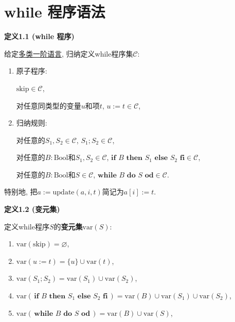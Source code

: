 \documentclass[UTF8]{ctexart}
\begin{document}
\setlength{\abovedisplayskip}{1pt}
\setlength{\belowdisplayskip}{1pt}

\section{while 程序语法}

\hypertarget{sec:定义1.1}{}
\noindent\textbf{定义1.1 (while 程序)}

给定\href{01 多类一阶语言#nameddest=sec:定义1.1}{多类一阶语言},
归纳定义while程序集$\mathcal{C}$:
\begin{enumerate}
    \item 原子程序:
    
    \hspace{3em}$\mathrm{skip}\in\mathcal{C}$,

    \hspace{3em}对任意同类型的变量$u$和项$t$, $u:=t\in\mathcal{C}$,

    \item 归纳规则:
    
    \hspace{3em}对任意的$S_1,S_2\in\mathcal{C}$, $S_1;S_2\in\mathcal{C}$,

    \hspace{3em}对任意的$B:\mathrm{Bool}$和$S_1,S_2\in\mathcal{C}$,
    $\mathbf{if}\,\,B\,\,\mathbf{then}\,\,S_1\,\,\mathbf{else}\,\,S_2
    \,\,\mathbf{fi}\in\mathcal{C}$,

    \hspace{3em}对任意的$B:\mathrm{Bool}$和$S\in\mathcal{C}$,
    $\mathbf{while}\,\,B\,\,\mathbf{do}\,\,S\,\,\mathbf{od}\in\mathcal{C}$.
\end{enumerate}

\vspace{10pt}

特别地, 把$a:=\mathrm{update}(a,i,t)$简记为$a[i]:=t$.

\vspace{30pt}

\hypertarget{sec:定义1.2}{}
\noindent\textbf{定义1.2 (变元集)}

定义while程序$S$的\textbf{变元集}$\mathrm{var}(S)$:
\begin{enumerate}
    \item $\mathrm{var}(\mathrm{skip})=\varnothing$,
    \item $\mathrm{var}(u:=t)=\{u\}\cup\mathrm{var}(t)$,
    \item $\mathrm{var}(S_1;S_2)=\mathrm{var}(S_1)\cup\mathrm{var}(S_2)$,
    \item $\mathrm{var}(\,\mathbf{if}\,\,B\,\,\mathbf{then}\,\,S_1\,\,
    \mathbf{else}\,\,S_2\,\,\mathbf{fi}\,)=\mathrm{var}(B)\cup
    \mathrm{var}(S_1)\cup\mathrm{var}(S_2)$,
    \item $\mathrm{var}(\,\mathbf{while}\,\,B\,\,\mathbf{do}\,\,S
    \,\,\mathbf{od}\,)=\mathrm{var}(B)\cup\mathrm{var}(S)$,
\end{enumerate}
\end{document}
